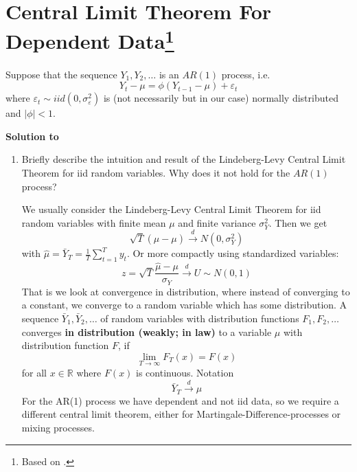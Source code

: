 \documentclass[a4paper]{scrartcl}
\begin{document}
    \section[Central Limit Theorem For Dependent Data]{Central Limit Theorem For Dependent Data\footnote{Based on \citet{CrackLedoit.2010}.}}\label{ex:CLTDep}
    Suppose that the sequence $Y_{1},Y_{2},\ldots $ is an $AR(1)$ process, i.e.
    $$Y_{t}-\mu =\phi \left(Y_{t-1}-\mu\right) +\varepsilon _{t}$$ where $\varepsilon _{t}\sim iid(0,\sigma _{\varepsilon }^{2})$ is (not necessarily but in our case) normally distributed and $|\phi |<1$.
    \begin{solution}\textbf{Solution to }\end{solution}
    \begin{enumerate}
        \item Briefly describe the intuition and result of the Lindeberg-Levy Central Limit Theorem for iid random variables. Why does it not hold for the $AR(1)$ process?
              \begin{solution}
                  We usually consider the Lindeberg-Levy Central Limit Theorem for iid random variables with finite mean $\mu$ and finite variance $\sigma_Y^2$. Then we get $$\sqrt{T} (\hat{\mu}-\mu) \overset{d}{\rightarrow} N(0,\sigma_Y^2)$$ with $\hat{\mu} = \bar{Y}_T = \frac{1}{T} \sum_{t=1}^T y_t$. Or more compactly using standardized variables: $$z = \sqrt{T}\frac{\hat{\mu}-\mu}{\sigma_Y}\overset{d}{\rightarrow} U \sim N(0,1)$$
                  That is we look at convergence in distribution, where instead of converging to a constant, we converge to a random variable which has some distribution. A sequence $\bar{Y}_{1},\bar{Y}_{2},\ldots $ of random variables with distribution functions $F_{1},F_{2},\ldots $ converges \textbf{in distribution (weakly; in law)} to a variable $\mu$ with distribution function $F$, if
                  \begin{equation*}
                      \lim_{T\rightarrow \infty }F_{T}(x)=F(x)
                  \end{equation*}
                  for all $x\in \mathbb{R}$ where $F(x)$ is continuous. Notation
                  \begin{equation*}
                      \bar{Y}_{T}\overset{d}{\rightarrow }\mu
                  \end{equation*}
                  For the AR(1) process we have dependent and not iid data, so we require a different central limit theorem, either for Martingale-Difference-processes or mixing processes.
                  

\end{solution}
\end{enumerate}
\end{document}
